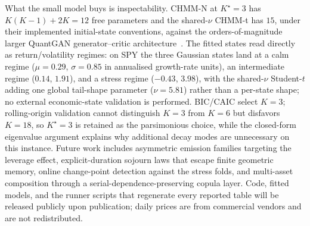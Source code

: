 What the small model buys is inspectability. CHMM-N at $K^\star = 3$ has $K(K-1) + 2K = 12$ free parameters and the shared-$\nu$ CHMM-t has $15$, under their implemented initial-state conventions, against the orders-of-magnitude larger QuantGAN generator--critic architecture~\cite{wiese2020quantgan}. The fitted states read directly as return/volatility regimes: on SPY the three Gaussian states land at a calm regime ($\mu = 0.29$, $\sigma = 0.85$ in annualised growth-rate units), an intermediate regime ($0.14$, $1.91$), and a stress regime ($-0.43$, $3.98$), with the shared-$\nu$ Student-$t$ adding one global tail-shape parameter ($\nu = 5.81$) rather than a per-state shape; no external economic-state validation is performed. BIC/CAIC select $K = 3$; rolling-origin validation cannot distinguish $K = 3$ from $K = 6$ but disfavors $K = 18$, so $K^\star = 3$ is retained as the parsimonious choice, while the closed-form eigenvalue argument explains why additional decay modes are unnecessary on this instance. Future work includes asymmetric emission families targeting the leverage effect, explicit-duration sojourn laws that escape finite geometric memory, online change-point detection against the stress folds, and multi-asset composition through a serial-dependence-preserving copula layer. Code, fitted models, and the runner scripts that regenerate every reported table will be released publicly upon publication; daily prices are from commercial vendors and are not redistributed.
